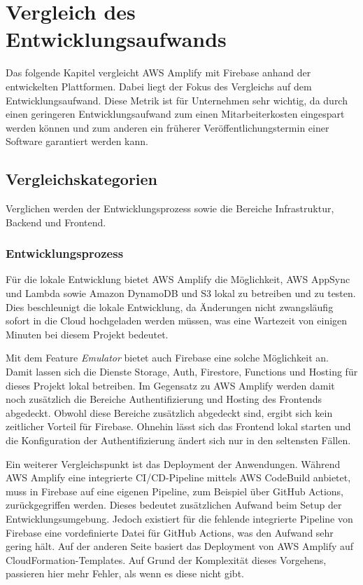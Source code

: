 \chapter{Vergleich des Entwicklungsaufwands}

Das folgende Kapitel vergleicht \ac{AWS} Amplify mit Firebase anhand der entwickelten Plattformen. Dabei liegt der Fokus des Vergleichs auf dem Entwicklungsaufwand. Diese Metrik ist für Unternehmen sehr wichtig, da durch einen geringeren Entwicklungsaufwand zum einen Mitarbeiterkosten eingespart werden können und zum anderen ein früherer Veröffentlichungstermin einer Software garantiert werden kann.

\section{Vergleichskategorien}

Verglichen werden der Entwicklungsprozess sowie die Bereiche Infrastruktur, Backend und Frontend.

\subsection{Entwicklungsprozess}

Für die lokale Entwicklung bietet \ac{AWS} Amplify die Möglichkeit, \ac{AWS} AppSync und Lambda sowie Amazon DynamoDB und S3 lokal zu betreiben und zu testen. Dies beschleunigt die lokale Entwicklung, da Änderungen nicht zwangsläufig sofort in die Cloud hochgeladen werden müssen, was eine Wartezeit von einigen Minuten bei diesem Projekt bedeutet.

Mit dem Feature \textit{Emulator} bietet auch Firebase eine solche Möglichkeit an. Damit lassen sich die Dienste Storage, Auth, Firestore, Functions und Hosting für dieses Projekt lokal betreiben. Im Gegensatz zu \ac{AWS} Amplify werden damit noch zusätzlich die Bereiche Authentifizierung und Hosting des Frontends abgedeckt. Obwohl diese Bereiche zusätzlich abgedeckt sind, ergibt sich kein zeitlicher Vorteil für Firebase. Ohnehin lässt sich das Frontend lokal starten und die Konfiguration der Authentifizierung ändert sich nur in den seltensten Fällen.

Ein weiterer Vergleichspunkt ist das Deployment der Anwendungen. Während \ac{AWS} Amplify eine integrierte CI/CD-Pipeline mittels \ac{AWS} CodeBuild anbietet, muss in Firebase auf eine eigenen Pipeline, zum Beispiel über GitHub Actions, zurückgegriffen werden. Dieses bedeutet zusätzlichen Aufwand beim Setup der Entwicklungsumgebung. Jedoch existiert für die fehlende integrierte Pipeline von Firebase eine vordefinierte Datei für GitHub Actions, was den Aufwand sehr gering hält. Auf der anderen Seite basiert das Deployment von \ac{AWS} Amplify auf CloudFormation-Templates. Auf Grund der Komplexität dieses Vorgehens, passieren hier mehr Fehler, als wenn es diese nicht gibt.

